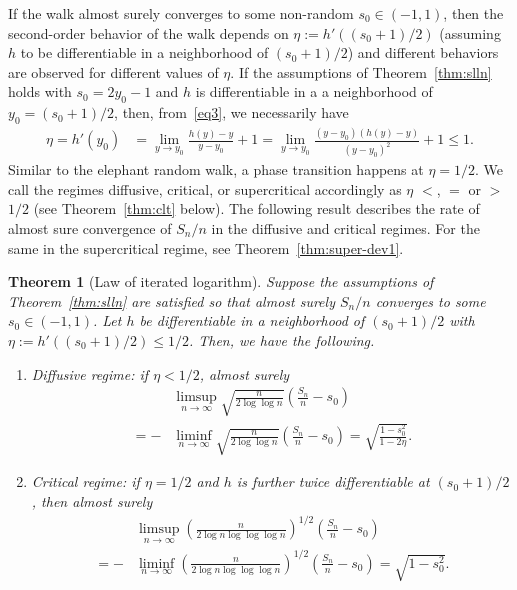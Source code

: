 \documentclass[12pt]{amsart}
\theoremstyle{plain}
\newtheorem{theorem}{Theorem}[section]
\theoremstyle{remark}
\numberwithin{equation}{section}
\begin{document}
If the walk almost surely converges to some non-random $s_0 \in (-1,1)$, then the second-order behavior of the walk depends on $\eta := h'((s_0+1)/2)$ (assuming $h$ to be differentiable in a neighborhood of $(s_0+1)/2$) and different behaviors are observed for different values of $\eta$. If the assumptions of Theorem~\ref{thm:slln} holds with $s_0 = 2y_0 - 1$ and $h$ is differentiable in a a neighborhood of $y_0 = (s_0+1)/2$, then, from~\eqref{eq3}, we necessarily have
\begin{align*}
    \eta = h'(y_0) & 
    = \lim_{y\to y_0} \frac{h(y) - y}{y-y_0} + 1
    = \lim_{y\to y_0} \frac{\left(y-y_0\right)\left(h(y) - y\right)}{\left(y-y_0\right)^2} + 1
    \leq 1.
\end{align*} Similar to the elephant random walk, a phase transition happens at $\eta = 1/2$. We call the regimes diffusive, critical, or supercritical accordingly as $\eta$ $<$, $=$ or $>$ $1/2$ (see Theorem~\ref{thm:clt} below). The following result describes the rate of almost sure convergence of $S_n/n$ in the diffusive and critical regimes. For the same in the supercritical regime, see Theorem~\ref{thm:super-dev1}. 
 
\begin{theorem}[Law of iterated logarithm]\label{thm:lil}
Suppose the assumptions of Theorem~\ref{thm:slln} are satisfied so that almost surely ${S_n}/{n}$ converges to some $s_0\in (-1,1)$. Let $h$ be differentiable in a neighborhood of $(s_0+1)/2$ 
with $\eta := h'((s_0+1)/2) \leq 1/2$. Then, we have the following.
\begin{enumerate}
\item[a)] Diffusive regime: if $\eta < {1}/{2}$, almost surely
\begin{align}\label{eq:lil-ldrw1}
    &\limsup_{n \to \infty}\sqrt{\frac{n}{2\log\log n}} \left(\frac{S_n}{n} - s_0\right)  \nonumber 
    \\ = - &\liminf_{n \to \infty}\sqrt{\frac{n}{2\log\log n}} \left(\frac{S_n}{n} - s_0\right) = \sqrt{\frac{1-s^2_0}{1-2\eta}}. 
\end{align}
\item[b)] Critical regime: if $\eta = {1}/{2}$ and $h$ is further twice differentiable at $(s_0+1)/2$, then almost surely
\begin{align}\label{eq:lil-ldrw2}
    &\limsup_{n \to \infty}\left(\frac{n}{2\log n\log\log\log n}\right)^{1/2} \left(\frac{S_n}{n} - s_0\right) \nonumber \\ = - &\liminf_{n \to \infty}\left(\frac{n}{2\log n\log\log\log n}\right)^{1/2} \left(\frac{S_n}{n} - s_0\right) = \sqrt{{1-s^2_0}}. 
\end{align}
\end{enumerate}
\end{theorem} 
\end{document}
